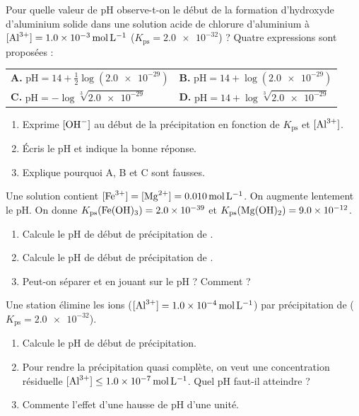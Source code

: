 \documentclass[11pt,a4paper]{article}
\begin{document}
\begin{exo}
Pour quelle valeur de pH observe-t-on le début de la formation d'hydroxyde d'aluminium 
solide dans une solution acide de chlorure d'aluminium à $[\ce{Al^{3+}}]=\qty{1.0e-3}{\mole\per\litre}$
($K_{\mathrm{ps}}=\num{2.0e-32}$) ? Quatre expressions sont proposées :
\begin{center}
\begin{tabular}{ll}
\textbf{A.} $\mathrm{pH}=14+\tfrac{1}{2}\log(\num{2.0e-29})$ &\quad
\textbf{B.} $\mathrm{pH}=14+\log(\num{2.0e-29})$ \\[4pt]
\textbf{C.} $\mathrm{pH}=-\log\sqrt[3]{\num{2.0e-29}}$ &\quad
\textbf{D.} $\mathrm{pH}=14+\log\sqrt[3]{\num{2.0e-29}}$ \\
\end{tabular}
\end{center}
\begin{enumerate}[label=\alph*)]
  \item Exprime $[\ce{OH-}]$ au début de la précipitation en fonction de $K_{\mathrm{ps}}$ et
        $[\ce{Al^{3+}}]$.
  \item Écris le pH et indique la bonne réponse.
  \item Explique pourquoi A, B et C sont fausses.
\end{enumerate}
\end{exo}

\begin{exo}
Une solution contient $[\ce{Fe^{3+}}]=[\ce{Mg^{2+}}]=\qty{0.010}{\mole\per\litre}$. On augmente
lentement le pH. On donne $K_{\mathrm{ps}}(\ce{Fe(OH)3})=\num{2.0e-39}$ et
$K_{\mathrm{ps}}(\ce{Mg(OH)2})=\num{9.0e-12}$.
\begin{enumerate}[label=\alph*)]
  \item Calcule le pH de début de précipitation de .
  \item Calcule le pH de début de précipitation de .
  \item Peut-on séparer  et  en jouant sur le pH ? Comment ?
\end{enumerate}
\end{exo}

\begin{exo}
Une station élimine les ions  ($[\ce{Al^{3+}}]=\qty{1.0e-4}{\mole\per\litre}$) par
précipitation de  ($K_{\mathrm{ps}}=\num{2.0e-32}$).
\begin{enumerate}[label=\alph*)]
  \item Calcule le pH de début de précipitation.
  \item Pour rendre la précipitation quasi complète, on veut une concentration résiduelle
        $[\ce{Al^{3+}}]\le\qty{1.0e-7}{\mole\per\litre}$. Quel pH faut-il atteindre ?
  \item Commente l'effet d'une hausse de pH d'une unité.
\end{enumerate}
\end{exo}
\end{document}
